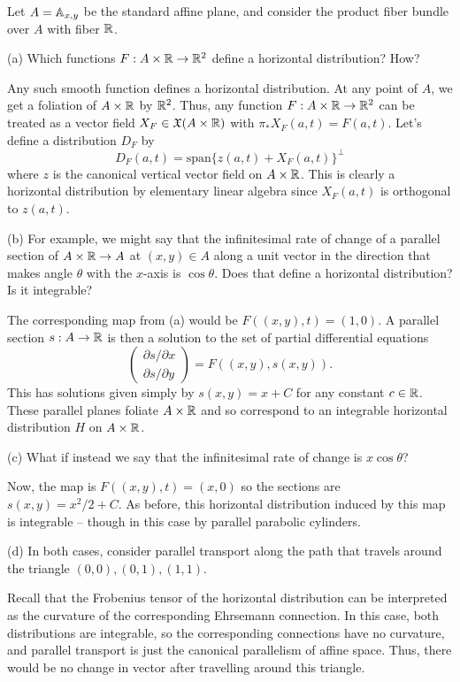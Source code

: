 \documentclass{../../templates/lkx_pset}
\begin{document}
\begin{problem}{5}
  Let $A=\mathbb{A}_{x,y}$ be the standard affine plane, and consider the product fiber bundle over $A$ with fiber $\mathbb{R}$.
\end{problem}
\begin{parts}
  \begin{part}{(a)}
    Which functions $F : A \times \mathbb{R} \to \mathbb{R}^2$ define a horizontal distribution? How?
  \end{part}

  Any such smooth function defines a horizontal distribution. At any point of $A$, we get a foliation of $A\times \mathbb{R}$ by $\mathbb{R}^2$. Thus, any function $F : A\times \mathbb{R} \to \mathbb{R}^2$ can be treated as a vector field $X_F \in \mathfrak{X}(A\times \mathbb{R})$ with $\pi_* X_F(a, t) = F(a,t)$. Let's define a distribution $D_F$ by
  \[
  D_F(a,t) = \textrm{span}\{z(a,t) + X_F(a,t)\}^\perp
  \]
  where $z$ is the canonical vertical vector field on $A\times \mathbb{R}$. This is clearly a horizontal distribution by elementary linear algebra since $X_F(a,t)$ is orthogonal to $z(a,t)$.

  \begin{part}{(b)}
    For example, we might say that the infinitesimal rate of change of a parallel section of $A\times \mathbb{R} \to A$ at $(x,y)\in A$ along a unit vector in the direction that makes angle $\theta$ with the $x$-axis is $\cos\theta$. Does that define a horizontal distribution? Is it integrable?
  \end{part}

  The corresponding map from (a) would be $F((x,y),t)= (1,0)$. A parallel section $s : A\to \mathbb{R}$ is then a solution to the set of partial differential equations
  \[
    \begin{pmatrix}
      \partial s/\partial x\\ \partial s/\partial y
    \end{pmatrix}
    =F((x,y), s(x,y)).
  \]
  This has solutions given simply by $s(x,y)=x+C$ for any constant $c\in \mathbb{R}$. These parallel planes foliate $A\times \mathbb{R}$ and so correspond to an integrable horizontal distribution $H$ on $A\times \mathbb{R}$.

  \begin{part}{(c)}
    What if instead we say that the infinitesimal rate of change is $x\cos\theta$?
  \end{part}
    Now, the map is $F((x,y), t) = (x,0)$ so the sections are $s(x,y)=x^2/2+C$. As before, this horizontal distribution induced by this map is integrable -- though in this case by parallel parabolic cylinders.

  \begin{part}{(d)}
    In both cases, consider parallel transport along the path that travels around the triangle $(0,0), (0,1), (1,1)$.
  \end{part}
  Recall that the Frobenius tensor of the horizontal distribution can be interpreted as the curvature of the corresponding Ehrsemann connection. In this case, both distributions are integrable, so the corresponding connections have no curvature, and parallel transport is just the canonical parallelism of affine space. Thus, there would be no change in vector after travelling around this triangle.
\end{parts}
\end{document}
